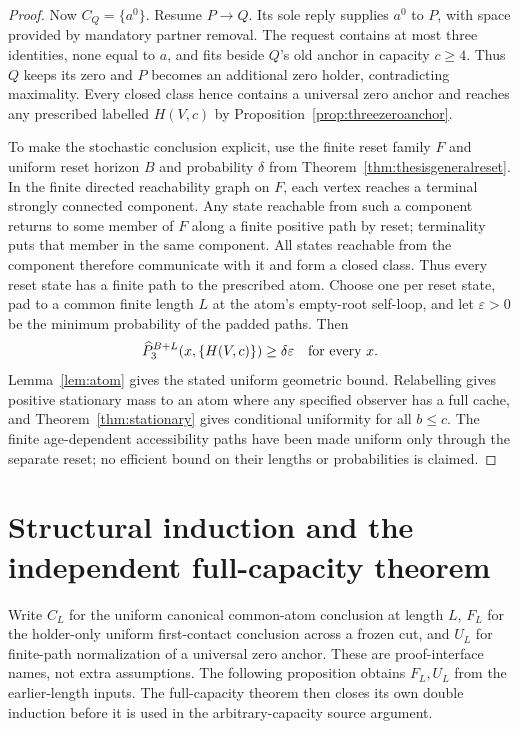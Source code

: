 \documentclass[11pt]{article}
\begin{document}
\begin{proof}
Now $C_Q=\{a^0\}$. Resume $P\to Q$. Its sole reply supplies
$a^0$ to $P$, with space provided by mandatory partner removal.
The request contains at most three identities, none equal to
$a$, and fits beside $Q$'s old anchor in capacity $c\ge4$.
Thus $Q$ keeps its zero and $P$ becomes an additional zero
holder, contradicting maximality. Every closed class hence
contains a universal zero anchor and reaches any prescribed
labelled $H(V,c)$ by Proposition~\ref{prop:threezeroanchor}.

To make the stochastic conclusion explicit, use the finite
reset family $F$ and uniform reset horizon $B$ and probability
$\delta$ from Theorem~\ref{thm:thesisgeneralreset}. In the
finite directed reachability graph on $F$, each vertex reaches
a terminal strongly connected component. Any state reachable
from such a component returns to some member of $F$ along a
finite positive path by reset; terminality puts that member
in the same component. All states reachable from the component
therefore communicate with it and form a closed class. Thus
every reset state has a finite path to the prescribed atom.
Choose one per reset state, pad to a common finite length $L$
at the atom's empty-root self-loop, and let $\varepsilon>0$
be the minimum probability of the padded paths. Then
\[
 \widehat P_3^{B+L}(x,\{H(V,c)\})\ge\delta\varepsilon
 \quad\hbox{for every }x.
\]
Lemma~\ref{lem:atom} gives the stated uniform geometric bound.
Relabelling gives positive stationary mass to an atom where
any specified observer has a full cache, and
Theorem~\ref{thm:stationary} gives conditional uniformity for
all $b\le c$. The finite age-dependent accessibility paths
have been made uniform only through the separate reset; no
efficient bound on their lengths or probabilities is claimed.
\end{proof}

\section{Structural induction and the independent full-capacity theorem}
Write $C_L$ for the uniform canonical common-atom conclusion at length
$L$, $F_L$ for the holder-only uniform first-contact conclusion across
a frozen cut, and $U_L$ for finite-path normalization of a universal
zero anchor. These are proof-interface names, not extra assumptions.
The following proposition obtains $F_L,U_L$ from the earlier-length
inputs. The full-capacity theorem then closes its own double induction
before it is used in the arbitrary-capacity source argument.
\end{document}
